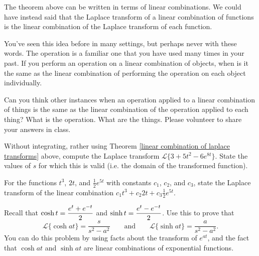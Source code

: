 \begin{problem*}
The theorem above can be written in terms of linear combinations. We could have instead said that the Laplace transform of a linear combination of functions is the linear combination of the Laplace transform of each function. 

You've seen this idea before in many settings, but perhaps never with these words. The operation is a familiar one that you have used many times in your past.  If you perform an operation on a linear combination of objects, when is it the same as the linear combination of performing the operation on each object individually. 

Can you think other instances when an operation applied to a linear combination of things is the same as the linear combination of the operation applied to each thing? What is the operation.  What are the things. Please volunteer to share your answers in class.  
\end{problem*}

\begin{problem}\label{laplace transform of linear combination practice}
Without integrating, rather using Theorem \ref{linear combination of laplace transforms} above, compute the Laplace transform $\mathscr{L}\{3+5t^2-6e^{8t}\}$.  State the values of $s$ for which this is valid (i.e. the domain of the transformed function). 

For the functions $t^3$, $2t$, and $\frac{1}{2}e^{5t}$ with constants $c_1$, $c_2$, and $c_3$, state the Laplace transform of the linear combination $c_1t^3+c_2 2t+c_3\frac{1}{2}e^{5t}$.
\end{problem}


\begin{problem}\label{laplace transform of cosh and sinh}
Recall that $\displaystyle\cosh t = \frac{e^t+e^{-t}}{2}$ and $\displaystyle\sinh t = \frac{e^t-e^{-t}}{2}$. 
Use this to prove that $$\mathscr{L}\{\cosh a t\} = \frac{s}{s^2-a^2}\quad \quad \text{and}\quad\quad\mathscr{L}\{\sinh a t\} = \frac{a}{s^2-a^2}.$$ You can do this problem by using facts about the transform of $e^{at}$, and the fact that $\cosh at$ and $\sinh at$ are linear combinations of exponential functions. 
\end{problem}

\subsection*{\ideaA}


